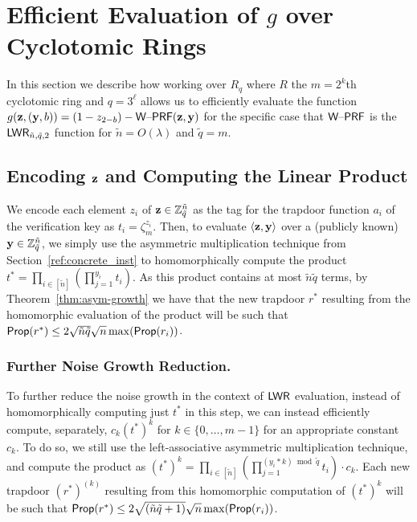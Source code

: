 \section{Efficient Evaluation of $g$ over Cyclotomic Rings}
\label{sec:weak-prf-evaluation}

In this section we describe how working over $R_q$ where $R$ the $m=2^{k}$th cyclotomic ring and $q=3^{\ell}$  allows us to
efficiently evaluate the
function $g(\mathbf{z},(\mathbf{y},b))=(1-z_{2-b})-\mathsf{W\text{\textendash}PRF}(\mathbf{z},\mathbf{y})$
 for
the specific case that $\mathsf{W\text{\textendash}PRF}$ is the $\mathsf{LWR}_{\tilde{n},\tilde{q},2}$
function for $\tilde{n}=O(\lambda)$ and $\tilde{q}=m$. 




\subsection{Encoding $\mathbf{z}$ and Computing the Linear Product}
\label{sec:encoding-z-into}

We encode each element $z_i$  of $\mathbf{z} \in
\mathbb{Z}_{\tilde{q}}^{\tilde{n}}$ as the tag for the trapdoor function $a_i$ of the
verification key
as $t_i=\zeta_{m}^{z_i}$. Then, to evaluate $\langle\mathbf{z},\mathbf{y}\rangle$ over a (publicly
known) $\mathbf{y} \in \mathbb{Z}_{\tilde{q}}^{\tilde{n}}$, we simply use the
asymmetric multiplication technique from
Section~\ref{ref:concrete_inst} to homomorphically compute the product 
$t^*=\prod_{i \in [\tilde{n}]} (\prod_{j=1}^{y_i} t_i)$. 
As this product contains at most $\tilde{n}\tilde{q}$ terms, by
Theorem~\ref{thm:asym-growth} we have that the new trapdoor $r^*$
resulting from the homomorphic evaluation of the product will be such
that $\mathsf{Prop}(r^*) \leq 2\sqrt{\tilde{n}\tilde{q}}\sqrt{n}\max(\mathsf{Prop}(r_i))$.


\subsubsection{Further Noise Growth Reduction.}
\label{sec:further-efficiency}

To further reduce the noise growth in the context of $\mathsf{LWR}$ evaluation, instead of
homomorphically computing just $t^*$ in this step, we can instead efficiently
compute, separately, $c_{k}(t^*)^{k}$ for $k \in
\{0,\ldots, m-1\}$ for an appropriate constant $c_{k}$. To do so, we
still use the left-associative asymmetric
multiplication technique, and compute the product as
$(t^*)^k=\prod_{i \in [\tilde{n}]} (\prod_{j=1}^{(y_i * k)
  \bmod{\tilde{q}}} t_i) \cdot c_{k}$. Each new trapdoor $(r^*)^{(k)}$ resulting from this
homomorphic computation of $(t^*)^k$ will be such that $\mathsf{Prop}(r^*)
\leq 2\sqrt{(\tilde{n}\tilde{q}+1)}\sqrt{n}\max(\mathsf{Prop}(r_i))$. 



